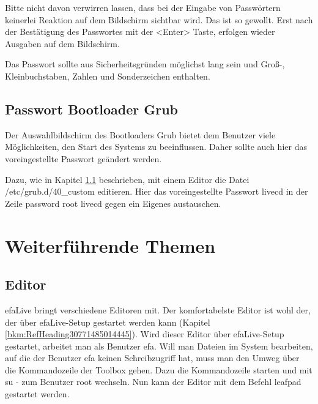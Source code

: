 \documentclass[a4paper,12pt,twoside]{article}
\begin{document}
Bitte nicht davon verwirren lassen, dass bei der Eingabe von Passwörtern
keinerlei Reaktion auf dem Bildschirm sichtbar wird. Das ist so
gewollt. Erst nach der Bestätigung des Passwortes mit der
{\textless}Enter{\textgreater} Taste, erfolgen wieder Ausgaben auf dem
Bildschirm.

Das Passwort sollte aus Sicherheitsgründen möglichst lang sein und
Groß-, Kleinbuchstaben, Zahlen und Sonderzeichen enthalten.


\bigskip

\subsection[Passwort Bootloader Grub]{Passwort Bootloader Grub}
Der Auswahlbildschirm des Bootloaders Grub \cite{GRB1} bietet dem
Benutzer viele Möglichkeiten, den Start des Systems zu beeinflussen.
Daher sollte auch hier das voreingestellte Passwort geändert werden.

Dazu, wie in Kapitel \ref{bkm:RefHeading2936838803289} beschrieben, mit
einem Editor die Datei /etc/grub.d/40\_custom editieren. Hier das
voreingestellte Passwort {\textquotedbl}livecd{\textquotedbl} in der
Zeile {\textquotedbl}password root livecd{\textquotedbl} gegen ein
Eigenes austauschen.


\bigskip

\section{Weiterführende Themen}
\subsection[Editor]{Editor}
\label{bkm:RefHeading2936838803289}efaLive bringt verschiedene Editoren
mit. Der komfortabelste Editor ist wohl der, der über efaLive-Setup
gestartet werden kann (Kapitel \ref{bkm:RefHeading30771485014445}).
Wird dieser Editor über efaLive-Setup gestartet, arbeitet man als
Benutzer {\textquotedbl}efa{\textquotedbl}. Will man Dateien im System
bearbeiten, auf die der Benutzer {\textquotedbl}efa{\textquotedbl}
keinen Schreibzugriff hat, muss man den Umweg über die Kommandozeile
der Toolbox gehen. Dazu die Kommandozeile starten und mit
{\textquotedbl}su -{\textquotedbl} zum Benutzer
{\textquotedbl}root{\textquotedbl} wechseln. Nun kann der Editor mit
dem Befehl {\textquotedbl}leafpad{\textquotedbl} gestartet werden.


\bigskip
\end{document}
